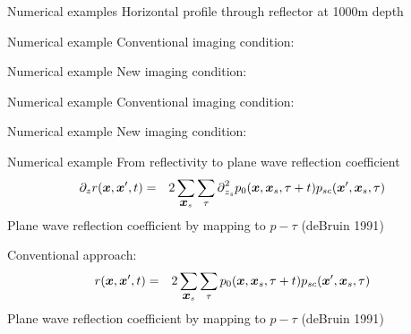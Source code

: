 \documentclass[xcolor=dvipsnames]{beamer}
\begin{document}
\begin{frame}{Numerical examples}
Horizontal profile through reflector at 1000m depth
\begin{figure}
\end{figure}
\end{frame}
\begin{frame}{Numerical example}
Conventional imaging condition:
\begin{figure}
\end{figure}
\end{frame}
\begin{frame}{Numerical example}
New imaging condition:
\begin{figure}
\end{figure}
\end{frame}
\begin{frame}{Numerical example}
Conventional imaging condition:
\begin{figure}
\end{figure}
\end{frame}
\begin{frame}{Numerical example}
New imaging condition:
\begin{figure}
\end{figure}
\end{frame}
\begin{frame}{Numerical example}
From reflectivity to plane wave reflection coefficient
\begin{eqnarray}
  \partial_z r(\mbox{\boldmath $x$},\mbox{\boldmath $x$}',t) & = & 
   2\sum_{\mbox{\boldmath $x$}_s}\sum_{\tau}\mbox{$\partial$}^2_{z_s} p_0(\mbox{\boldmath $x$},\mbox{\boldmath $x$}_s,\tau+t)p_{sc}(\mbox{\boldmath $x$}',\mbox{\boldmath $x$}_s,\tau)
\end{eqnarray}
Plane wave reflection coefficient by mapping to $p-\tau$ (deBruin 1991\cite{Bruin1990}) 

\vspace{1cm}
Conventional approach:
\begin{eqnarray}
  r(\mbox{\boldmath $x$},\mbox{\boldmath $x$}',t) & = & 
   2\sum_{\mbox{\boldmath $x$}_s}\sum_{\tau}p_0(\mbox{\boldmath $x$},\mbox{\boldmath $x$}_s,\tau+t)p_{sc}(\mbox{\boldmath $x$}',\mbox{\boldmath $x$}_s,\tau)
\end{eqnarray}
Plane wave reflection coefficient by mapping to $p-\tau$ (deBruin 1991\cite{Bruin1990}) 

\end{frame}
\end{document}
